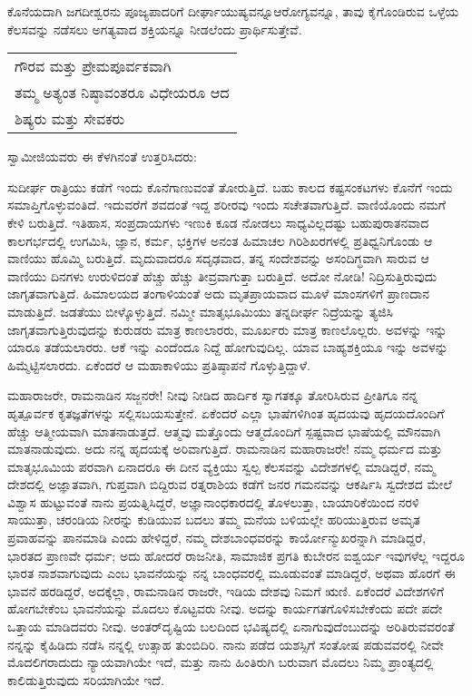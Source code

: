 ಕೊನೆಯದಾಗಿ ಜಗದೀಶ್ವರನು ಪೂಜ್ಯಪಾದರಿಗೆ ದೀರ್ಘಾಯುಷ್ಯವನ್ನೂ\break ಆರೋಗ್ಯವನ್ನೂ, ತಾವು ಕೈಗೊಂಡಿರುವ ಒಳ್ಳೆಯ ಕೆಲಸವನ್ನು ನಡೆಸಲು ಅಗತ್ಯವಾದ ಶಕ್ತಿಯನ್ನೂ ನೀಡಲೆಂದು ಪ್ರಾರ್ಥಿಸುತ್ತೇವೆ.

\begin{longtable}[r]{@{}l@{}}
ಗೌರವ ಮತ್ತು ಪ್ರೇಮಪೂರ್ವಕವಾಗಿ \\
ತಮ್ಮ ಅತ್ಯಂತ ನಿಷ್ಠಾವಂತರೂ ವಿಧೇಯರೂ ಆದ \\
ಶಿಷ್ಯರು ಮತ್ತು ಸೇವಕರು \\
\end{longtable}

ಸ್ವಾಮೀಜಿಯವರು ಈ ಕೆಳಗಿನಂತೆ ಉತ್ತರಿಸಿದರು:

ಸುದೀರ್ಘ ರಾತ್ರಿಯು ಕಡೆಗೆ ಇಂದು ಕೊನೆಗಾಣುವಂತೆ ತೋರುತ್ತಿದೆ. ಬಹು ಕಾಲದ ಕಷ್ಟಸಂಕಟಗಳು ಕೊನೆಗೆ ಇಂದು ಸಮಾಪ್ತಿಗೊಳ್ಳುವಂತಿದೆ. ಇದುವರೆಗೆ ಶವದಂತೆ ಇದ್ದ ಶರೀರವು ಇಂದು ಸಚೇತವಾಗುತ್ತಿದೆ. ವಾಣಿಯೊಂದು ನಮಗೆ ಕೇಳಿ ಬರುತ್ತಿದೆ. ಇತಿಹಾಸ, ಸಂಪ್ರದಾಯಗಳು ಇಣುಕಿ ಕೂಡ ನೋಡಲು ಸಾಧ್ಯವಿಲ್ಲದಷ್ಟು ಬಹುಪುರಾತನವಾದ ಕಾಲಗರ್ಭದಲ್ಲಿ ಉಗಮಿಸಿ, ಜ್ಞಾನ, ಕರ್ಮ, ಭಕ್ತಿಗಳ ಅನಂತ ಹಿಮಾಚಲ ಗಿರಿಶಿಖರಗಳಲ್ಲಿ ಪ್ರತಿಧ್ವನಿಗೊಂಡು ಆ ವಾಣಿಯು ಹೊಮ್ಮಿ ಬರುತ್ತಿದೆ. ಮೃದುವಾದರೂ ಸದೃಢವಾದ, ತನ್ನ ಸಂದೇಶವನ್ನು ಅಸಂದಿಗ್ಧವಾಗಿ ಸಾರುವ ಆ ವಾಣಿಯು ದಿನಗಳು ಉರುಳಿದಂತೆ ಹೆಚ್ಚು ಹೆಚ್ಚು ತೀವ್ರವಾಗುತ್ತಾ ಬರುತ್ತಿದೆ. ಅದೋ ನೋಡಿ! ನಿದ್ರಿಸುತ್ತಿರುವುದು ಜಾಗೃತವಾಗುತ್ತಿದೆ. ಹಿಮಾಲಯದ ತಂಗಾಳಿಯಂತೆ ಅದು ಮೃತಪ್ರಾಯವಾದ ಮೂಳೆ ಮಾಂಸಗಳಿಗೆ ಪ್ರಾಣದಾನ ಮಾಡುತ್ತಿದೆ. ಜಡತೆಯು ಬೀಳ್ಕೊಳ್ಳುತ್ತಿದೆ. ನಮ್ಮೀ ಮಾತೃಭೂಮಿಯು ತನ್ನದೀರ್ಘ ನಿದ್ರೆಯನ್ನು ತ್ಯಜಿಸಿ ಜಾಗೃತವಾಗುತ್ತಿರುವುದನ್ನು ಕುರುಡರು ಮಾತ್ರ ಕಾಣಲಾರರು, ಮೂರ್ಖರು ಮಾತ್ರ ಕಾಣಲೊಲ್ಲರು. ಅವಳನ್ನು ಇನ್ನು ಯಾರೂ ತಡೆಯಲಾರರು. ಆಕೆ ಇನ್ನು ಎಂದೆಂದೂ ನಿದ್ದೆ ಹೋಗುವುದಿಲ್ಲ. ಯಾವ ಬಾಹ್ಯಶಕ್ತಿಯೂ ಇನ್ನು ಅವಳನ್ನು ಹಿಮ್ಮೆಟ್ಟಿಸಲಾರದು. ಏಕೆಂದರೆ ಆ ಮಹಾಕಾಳಿಯು ಪ್ರತಿಷ್ಠಾಪನೆ ಗೊಳ್ಳುತ್ತಿದ್ದಾಳೆ. 

ಮಹಾರಾಜರೇ, ರಾಮನಾಡಿನ ಸಜ್ಜನರೇ! ನೀವು ನೀಡಿದ ಹಾರ್ದಿಕ ಸ್ವಾಗತಕ್ಕೂ ತೋರಿಸಿರುವ ಪ್ರೀತಿಗೂ ನನ್ನ ಹೃತ್ಪೂರ್ವಕ ಕೃತಜ್ಞತೆಗಳನ್ನು ಸಲ್ಲಿಸಬಯಸುತ್ತೇನೆ. ಏಕೆಂದರೆ ಎಲ್ಲಾ ಭಾಷೆಗಳಿಗಿಂತ ಹೃದಯವು ಹೃದಯದೊಂದಿಗೆ ಹೆಚ್ಚು ಆತ್ಮೀಯವಾಗಿ ಮಾತನಾಡುತ್ತದೆ. ಆತ್ಮವು ಮತ್ತೊಂದು ಆತ್ಮದೊಂದಿಗೆ ಸ್ಪಷ್ಟವಾದ ಭಾಷೆಯಲ್ಲಿ ಮೌನವಾಗಿ ಮಾತನಾಡುವುದು. ಅದು ನನ್ನ ಹೃದಯಕ್ಕೆ ಅರಿವಾಗುತ್ತಿದೆ. ರಾಮನಾಡಿನ ಮಹಾರಾಜರೇ! ನಮ್ಮ ಧರ್ಮದ ಮತ್ತು ಮಾತೃಭೂಮಿಯ ಪರವಾಗಿ ಏನಾದರೂ ಈ ದೀನ ವ್ಯಕ್ತಿಯು ಸ್ವಲ್ಪ ಕೆಲಸವನ್ನು ವಿದೇಶಗಳಲ್ಲಿ ಮಾಡಿದ್ದರೆ, ನಮ್ಮ ದೇಶದಲ್ಲಿ ಅಜ್ಞಾತವಾಗಿ, ಗುಪ್ತವಾಗಿ ಬಿದ್ದಿರುವ ರತ್ನರಾಶಿಯ ಕಡೆಗೆ ಜನರ ಗಮನವನ್ನು ಆಕರ್ಷಿಸಿ ಸ್ವದೇಶದ ಮೇಲೆ ವಿಶ್ವಾಸ ಹುಟ್ಟುವಂತೆ ನಾನು ಪ್ರಯತ್ನಿಸಿದ್ದರೆ, ಅಜ್ಞಾನಾಂಧಕಾರದಲ್ಲಿ ತೊಳಲುತ್ತಾ, ಬಾಯಾರಿಕೆಯಿಂದ ನರಳಿ ಸಾಯುತ್ತಾ, ಚರಂಡಿಯ ನೀರನ್ನು ಕುಡಿಯುವ ಬದಲು ತಮ್ಮ ಮನೆಯ ಬಳಿಯಲ್ಲೇ ಹರಿಯುತ್ತಿರುವ ಅಮೃತ ಪ್ರವಾಹವನ್ನು ಪಾನಮಾಡಿ ಎಂದು ಹೇಳಿದ್ದರೆ, ನಮ್ಮ ದೇಶಬಾಂಧವರನ್ನು ಕಾರ್ಯೋನ್ಮುಖರನ್ನಾಗಿ ಮಾಡಿದ್ದರೆ, ಭಾರತದ ಪ್ರಾಣವೇ ಧರ್ಮ; ಅದು ಹೋದರೆ ರಾಜನೀತಿ, ಸಾಮಾಜಿಕ ಪ್ರಗತಿ ಕುಬೇರನ ಐಶ್ವರ್ಯ ಇವುಗಳೆಲ್ಲ ಇದ್ದರೂ ಭಾರತ ನಾಶವಾಗುವುದು ಎಂಬ ಭಾವನೆಯನ್ನು ನನ್ನ ಬಾಂಧವರಲ್ಲಿ ಮೂಡುವಂತೆ ಮಾಡಿದ್ದರೆ, ಅಥವಾ ಹೊರಗೆ ಈ ಭಾವನೆ ಹರಡಿದ್ದರೆ, ಅದಕ್ಕೆಲ್ಲಾ, ರಾಮನಾಡಿನ ರಾಜರೇ, ಇಡಿಯ ದೇಶವು ನಿಮಗೆ ಋಣಿ. ಏಕೆಂದರೆ ವಿದೇಶಗಳಿಗೆ ಹೋಗಬೇಕೆಂಬ ಭಾವನೆಯನ್ನು ಮೊದಲು ಕೊಟ್ಟವರು ನೀವು. ಅದನ್ನು ಕಾರ್ಯಗತಗೊಳಿಸಬೇಕೆಂದು ಪದೇ ಪದೇ ಒತ್ತಾಯ ಮಾಡಿದವರು ನೀವು. ಅಂತರ್​ದೃಷ್ಟಿಯ ಬಲದಿಂದ ಭವಿಷ್ಯದಲ್ಲಿ ಏನಾಗುವುದೆಂಬುದನ್ನು ಅರಿತಿರುವವರಂತೆ ನನ್ನನ್ನು ಕೈಹಿಡಿದು ನಡೆಸಿ ನನ್ನಲ್ಲಿ ಉತ್ಸಾಹ ತುಂಬಿದಿರಿ. ನಾನು ಪಡೆದ ಯಶಸ್ಸಿಗೆ ಸಂತೋಷ ಪಡುವವರಲ್ಲಿ ನೀವೇ ಮೊದಲಿಗರಾದುದು ನ್ಯಾಯವಾಗಿಯೇ ಇದೆ, ಮತ್ತು ನಾನು ಹಿಂತಿರುಗಿ ಬರುವಾಗ ಮೊದಲು ನಿಮ್ಮ ಪ್ರಾಂತ್ಯದಲ್ಲಿ ಕಾಲಿಡುತ್ತಿರುವುದು ಸರಿಯಾಗಿಯೇ ಇದೆ. 

